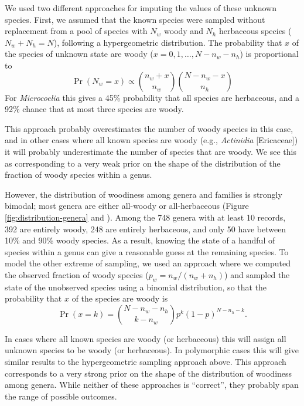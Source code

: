 \documentclass[a4paper,12pt]{article}
\begin{document}
We used two different approaches for imputing the values of these
unknown species. First, we assumed that the known species were sampled
without replacement from a pool of species with $N_w$ woody and $N_h$
herbaceous species ($N_w + N_h = N$), following a hypergeometric
distribution. The probability that $x$ of the species of unknown state
are woody ($x = 0, 1, \ldots, N - n_w - n_h$) is proportional to
\begin{equation}
  \Pr(N_w = x) \propto {n_w + x \choose n_w}
  {N - n_w - x \choose n_h}
\end{equation}
For \textit{Microcoelia} this gives a 45\% probability that all
species are herbaceous, and a 92\% chance that at most three species
are woody.

This approach probably overestimates the number of woody species in
this case, and in other cases where all known species are woody (e.g.,
\textit{Actinidia} [Ericaceae]) it will probably underestimate the
number of species that are woody. We see this as corresponding to a
very weak prior on the shape of the distribution of the fraction of
woody species within a genus.

However, the distribution of woodiness among genera and families is
strongly bimodal; most genera are either all-woody or all-herbaceous
(Figure \ref{fig:distribution-genera} and 
\citealt{sinnott1915evolution}).  Among the 748 genera with at least 10
records, 392 are entirely woody, 248 are entirely herbaceous, and only
50 have between 10\% and 90\% woody species. As a result, knowing the
state of a handful of species within a genus can give a reasonable
guess at the remaining species.
To model the other extreme of sampling, we used an approach where we
computed the observed fraction of woody species ($p_w = n_w / (n_w +
n_h)$) and sampled the state of the unobserved species using a
binomial distribution, so that the probability that $x$ of the species
are woody is
\begin{equation}
  \Pr(x = k) = {N - n_w - n_h \choose k - n_w} 
  p^k (1-p)^{N - n_h - k}.
\end{equation}

In cases where all known species are woody (or herbaceous) this will
assign all unknown species to be woody (or herbaceous). In polymorphic
cases this will give similar results to the hypergeometric sampling
approach above. This approach corresponds to a very strong prior on
the shape of the distribution of woodiness among genera.
While neither of these approaches is ``correct'', they probably
span the range of possible outcomes.
\end{document}
